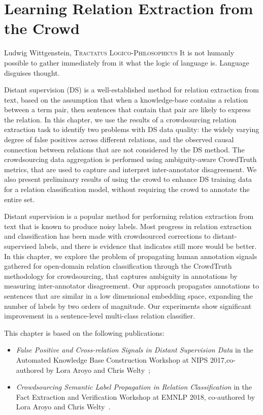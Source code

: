 \chapter{Learning Relation Extraction from the Crowd}
\label{chap:od-rel-ex}

\begin{chapquote}{Ludwig Wittgenstein, \textsc{Tractatus Logico-Philosophicus}}
It is not humanly possible to gather immediately from it what the logic of language is. Language disguises thought.
\end{chapquote}

Distant supervision (DS) is a well-established method for relation extraction from text, based on the assumption that when a knowledge-base contains a relation between a term pair, then sentences that contain that pair are likely to express the relation. In this chapter, we use the results of a crowdsourcing relation extraction task to identify two problems with DS data quality: the widely varying degree of false positives across different relations, and the observed causal connection between relations that are not considered by the DS method. The crowdsourcing data aggregation is performed using ambiguity-aware CrowdTruth metrics, that are used to capture and interpret inter-annotator disagreement. We also present preliminary results of using the crowd to enhance DS training data for a relation classification model, without requiring the crowd to annotate the entire set. 

Distant supervision is a popular method for performing relation extraction from text that is known to produce noisy labels.  Most progress in relation extraction and classification has been made with crowdsourced corrections to distant-supervised labels, and there is evidence that indicates still more would be better. In this chapter, we explore the problem of propagating human annotation signals gathered for open-domain relation classification through the CrowdTruth methodology for crowdsourcing, that captures ambiguity in annotations by measuring inter-annotator disagreement. Our approach propagates annotations to sentences that are similar in a low dimensional embedding space, expanding the number of labels by two orders of magnitude.  Our experiments show significant improvement in a sentence-level multi-class relation classifier.

This chapter is based on the following publications:

\begin{itemize}

\item \textit{False Positive and Cross-relation Signals in Distant Supervision Data} in the Automated 
Knowledge Base Construction Workshop at NIPS 2017,co-authored by Lora Aroyo and Chris Welty~\cite{dumitrache2017false};

\item \textit{Crowdsourcing Semantic Label Propagation in Relation Classification} in the Fact Extraction and Verification Workshop at EMNLP 2018, co-authored by Lora Aroyo and Chris Welty~\cite{dumitrache2018crowdsourcing}.

\end{itemize}

